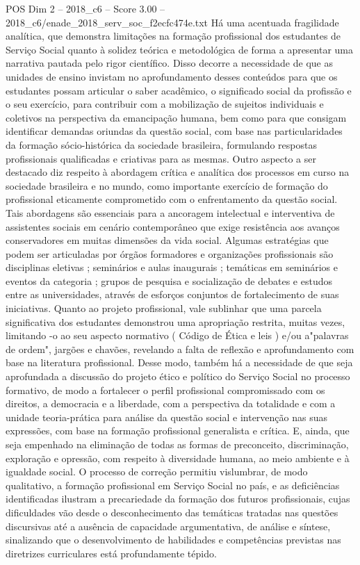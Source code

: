 \begin{textsample}{POS Dim 2 – 2018\_c6 – Score 3.00 – 2018\_c6/enade\_2018\_serv\_soc\_f2ecfc474e.txt}
Há uma acentuada fragilidade analítica, que demonstra limitações na formação profissional dos estudantes de Serviço Social quanto à solidez teórica e metodológica de forma a apresentar uma narrativa pautada pelo rigor científico.
Disso decorre a necessidade de que as unidades de ensino invistam no aprofundamento desses conteúdos para que os estudantes possam articular o saber acadêmico, o significado social da profissão e o seu exercício, para contribuir com a mobilização de sujeitos individuais e coletivos na perspectiva da emancipação humana, bem como para que consigam identificar demandas oriundas da questão social, com base nas particularidades da formação sócio-histórica da sociedade brasileira, formulando respostas profissionais qualificadas e criativas para as mesmas.
Outro aspecto a ser destacado diz respeito à abordagem crítica e analítica dos processos em curso na sociedade brasileira e no mundo, como importante exercício de formação do profissional eticamente comprometido com o enfrentamento da questão social.
Tais abordagens são essenciais para a ancoragem intelectual e interventiva de assistentes sociais em cenário contemporâneo que exige resistência aos avanços conservadores em muitas dimensões da vida social.
Algumas estratégias que podem ser articuladas por órgãos formadores e organizações profissionais são disciplinas eletivas ; seminários e aulas inaugurais ; temáticas em seminários e eventos da categoria ; grupos de pesquisa e socialização de debates e estudos entre as universidades, através de esforços conjuntos de fortalecimento de suas iniciativas.
Quanto ao projeto profissional, vale sublinhar que uma parcela significativa dos estudantes demonstrou uma apropriação restrita, muitas vezes, limitando -o ao seu aspecto normativo ( Código de Ética e leis ) e/ou a"palavras de ordem", jargões e chavões, revelando a falta de reflexão e aprofundamento com base na literatura profissional.
Desse modo, também há a necessidade de que seja aprofundada a discussão do projeto ético e político do Serviço Social no processo formativo, de modo a fortalecer o perfil profissional compromissado com os direitos, a democracia e a liberdade, com a perspectiva da totalidade e com a unidade teoria-prática para análise da questão social e intervenção nas suas expressões, com base na formação profissional generalista e crítica.
E, ainda, que seja empenhado na eliminação de todas as formas de preconceito, discriminação, exploração e opressão, com respeito à diversidade humana, ao meio ambiente e à igualdade social.
O processo de correção permitiu vislumbrar, de modo qualitativo, a formação profissional em Serviço Social no país, e as deficiências identificadas ilustram a precariedade da formação dos futuros profissionais, cujas dificuldades vão desde o desconhecimento das temáticas tratadas nas questões discursivas até a ausência de capacidade argumentativa, de análise e síntese, sinalizando que o desenvolvimento de habilidades e competências previstas nas diretrizes curriculares está profundamente tépido.

\end{textsample}
